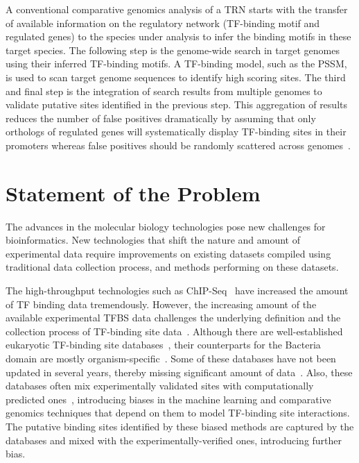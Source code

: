A conventional comparative genomics analysis of a TRN starts with the transfer
of available information on the regulatory network (TF-binding motif and
regulated genes) to the species under analysis to infer the binding motifs in
these target species. The following step is the genome-wide search in target
genomes using their inferred TF-binding motifs. A TF-binding model, such as the
PSSM, is used to scan target genome sequences to identify high scoring sites. The
third and final step is the integration of search results from multiple genomes
to validate putative sites identified in the previous step. This aggregation of
results reduces the number of false positives dramatically by assuming that
only orthologs of regulated genes will systematically display TF-binding sites
in their promoters whereas false positives should be randomly scattered across
genomes~\citep{rodionov2007comparative}.


\section{Statement of the Problem}

The advances in the molecular biology technologies pose new challenges for
bioinformatics. New technologies that shift the nature and amount of
experimental data require improvements on existing datasets compiled using
traditional data collection process, and methods performing on these datasets.

The high-throughput technologies such as ChIP-Seq~\citep{bailey2013practical}
have increased the amount of TF binding data tremendously. However, the
increasing amount of the available experimental TFBS data challenges the
underlying definition and the collection process of TF-binding site
data~\citep{salgado2013regulondb}. Although there are well-established
eukaryotic TF-binding site databases~\citep{mathelier2015jaspar,
  matys2003transfac}, their counterparts for the Bacteria domain are mostly
organism-specific~\citep{salgado2013regulondb, sierro2008dbtbs,
  jacques2005mtbreglist, pauling2012coryneregnet}. Some of these databases have
not been updated in several years, thereby missing significant amount of
data~\citep{munch2003prodoric}. Also, these databases often mix experimentally
validated sites with computationally predicted
ones~\citep{kazakov2007regtransbase}, introducing biases in the machine learning
and comparative genomics techniques that depend on them to model TF-binding
site interactions. The putative binding sites identified by
these biased methods are captured by the databases and mixed with the
experimentally-verified ones, introducing further bias.

